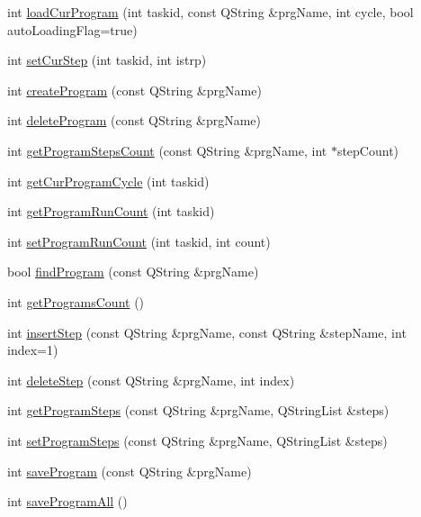 \begin{DoxyCompactItemize}
int \hyperlink{classCUIApp_aecf59073d1fb738c033b22f615172dd8}{load\-Cur\-Program} (int taskid, const Q\-String \&prg\-Name, int cycle, bool auto\-Loading\-Flag=true)
\item 
int \hyperlink{classCUIApp_ac137f1bd9ac1ada393c069943af1404c}{set\-Cur\-Step} (int taskid, int istrp)
\item 
int \hyperlink{classCUIApp_a15aeca2eb05975a0d22fdd92e3580f7a}{create\-Program} (const Q\-String \&prg\-Name)
\item 
int \hyperlink{classCUIApp_a12802aa0fbd6f6ec3ab9ef8a68ae3d5f}{delete\-Program} (const Q\-String \&prg\-Name)
\item 
int \hyperlink{classCUIApp_af7aa5b3cb8ec0e3053f2c594c2d53d33}{get\-Program\-Steps\-Count} (const Q\-String \&prg\-Name, int $\ast$step\-Count)
\item 
int \hyperlink{classCUIApp_acf883a14e463b52807f8eb1451db1e78}{get\-Cur\-Program\-Cycle} (int taskid)
\item 
int \hyperlink{classCUIApp_ad12e56e44ce01e82bd70616c0448598a}{get\-Program\-Run\-Count} (int taskid)
\item 
int \hyperlink{classCUIApp_ac9d5e6115e0369c90d96a58e208fe9ba}{set\-Program\-Run\-Count} (int taskid, int count)
\item 
bool \hyperlink{classCUIApp_a9fdc1f0419dbfb6fb9b5c699443aaa6f}{find\-Program} (const Q\-String \&prg\-Name)
\item 
int \hyperlink{classCUIApp_ac6aae50ce175ebb747b3cf6a09eac470}{get\-Programs\-Count} ()
\item 
int \hyperlink{classCUIApp_abb18a18a93e84838a34d99e10aa0b036}{insert\-Step} (const Q\-String \&prg\-Name, const Q\-String \&step\-Name, int index=1)
\item 
int \hyperlink{classCUIApp_a228f715f0ab12f6903fe78d4ce5fac8d}{delete\-Step} (const Q\-String \&prg\-Name, int index)
\item 
int \hyperlink{classCUIApp_a8829edc5cbe151eb81e310080f95e6b9}{get\-Program\-Steps} (const Q\-String \&prg\-Name, Q\-String\-List \&steps)
\item 
int \hyperlink{classCUIApp_a7cada6fdcbaf4f3390726ba03bb5f164}{set\-Program\-Steps} (const Q\-String \&prg\-Name, Q\-String\-List \&steps)
\item 
int \hyperlink{classCUIApp_a037de6d8be99831562b1c157eef1cfae}{save\-Program} (const Q\-String \&prg\-Name)
\item 
int \hyperlink{classCUIApp_a762c36f582d0f2d80280129a5cfa8845}{save\-Program\-All} ()
\item 

\end{DoxyCompactItemize}
